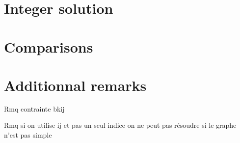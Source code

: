 \section{Integer solution}

\section{Comparisons}
\section{Additionnal remarks}









Rmq contrainte bkij

Rmq si on utilise ij et pas un seul indice on ne peut pas résoudre si le graphe n'est pas simple
